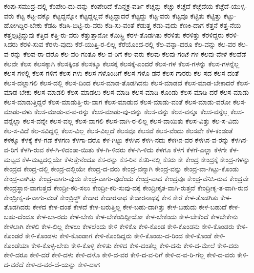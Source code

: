 {ಕೆಂಪು-ಸಮುದ್ರ-ದಲ್ಲಿ
ಕೆಂಪೇರಿ-ದು-ದನ್ನು
ಕೆಂಪೇರಿದೆ
ಕೆಎನ್ಚಕ್ರ-ವರ್ತಿ
ಕೆಚ್ಚನ್ನು
ಕೆಚ್ಚು
ಕೆಚ್ಚೆದೆ
ಕೆಚ್ಚೆದೆಯ
ಕೆಚ್ಚೆದೆ-ಯುಳ್ಳ-ವರು
ಕೆಟ್ಟ
ಕೆಟ್ಟ-ದಕ್ಕೊ
ಕೆಟ್ಟದ್ದನ್ನೋ
ಕೆಟ್ಟದ್ದಲ್ಲವೆ
ಕೆಟ್ಟದ್ದಾದರೆ
ಕೆಟ್ಟದ್ದು
ಕೆಟ್ಟ-ವರು
ಕೆಟ್ಟವೂ
ಕೆಟ್ಟಿತು
ಕೆಟ್ಟಿತ್ತು
ಕೆಟ್ಟು-ಹೋಗಿದ್ದಿರ-ಬೇಕು
ಕೆಡಹಿ
ಕೆಡಿಸಿ-ಬಿಟ್ಟಿ-ರು-ವರು
ಕೆಡಿ-ಸು-ವಂತೆ
ಕೆಡುತ್ತ
ಕೆಡು-ವುದು
ಕೆಣಕಿ-ದಾಗ
ಕೆತ್ತನೆ
ಕೆತ್ತ-ನೆಯ
ಕೆತ್ತಲ್ಪಟ್ಟಿದ್ದುವು
ಕೆತ್ತಿದ
ಕೆತ್ತಿ-ರು-ವರು
ಕೆತ್ತುತ್ತಾನೋ
ಕೆಮಿಸ್ಟ್ರಿ
ಕೆರಳ-ತೊಡಗಿತು
ಕೆರಳಿತು
ಕೆರಳಿತ್ತು
ಕೆರಳಿದ್ದರು
ಕೆರಳಿ-ಸಿದರು
ಕೆರಳಿ-ಸುವ
ಕೆರಳು-ವುದು
ಕೆರೆ-ಯುತ್ತಿ-ರ-ಲಿಲ್ಲ
ಕೆರೆಯೊಂದ-ರಲ್ಲಿ
ಕೆಲ-ವನ್ನಾ-ದರೂ
ಕೆಲ-ವನ್ನು
ಕೆಲ-ವರ
ಕೆಲ-ವ-ರನ್ನು
ಕೆಲವ-ರಾ-ದರೊ
ಕೆಲ-ವರಿ-ಗಂತೂ
ಕೆಲ-ವ-ರಿಗೆ
ಕೆಲ-ವರು
ಕೆಲವು
ಕೆಲವು-ಗಂಟೆ-ಗಳ
ಕೆಲವು-ವೇಳೆ
ಕೆಲವೆಡೆ
ಕೆಲವೇ
ಕೆಲಸ
ಕೆಲಸಕ್ಕಾಗಿ
ಕೆಲಸಕ್ಕಿಂತ
ಕೆಲಸಕ್ಕೂ
ಕೆಲಸಕ್ಕೆ
ಕೆಲಸಕ್ಕೆ-ಎಂದರೆ
ಕೆಲಸ-ಗಳ
ಕೆಲಸ-ಗಳನ್ನು
ಕೆಲಸ-ಗಳನ್ನೆಲ್ಲ
ಕೆಲಸ-ಗಳಲ್ಲಿ
ಕೆಲಸ-ಗಳಿಗೆ
ಕೆಲಸ-ಗಳು
ಕೆಲಸ-ಗಳೊಂದಿಗೆ
ಕೆಲಸ-ಗಳೊ-ಡನೆ
ಕೆಲಸ-ಗಾರರು
ಕೆಲ-ಸದ
ಕೆಲಸ-ದಂತೆ
ಕೆಲಸ-ದಲ್ಲಾಗಲಿ
ಕೆಲಸ-ದಲ್ಲಿ
ಕೆಲಸ-ದಿಂದ
ಕೆಲಸ-ಮಾಡ-ತೊಡಗಿದನು
ಕೆಲಸ-ಮಾಡದೆ
ಕೆಲಸ-ಮಾಡ-ಬೇಕಾದರೆ
ಕೆಲಸ-ಮಾಡ-ಬೇಕು
ಕೆಲಸ-ಮಾಡಲಿ
ಕೆಲಸ-ಮಾಡಲು
ಕೆಲಸ-ಮಾಡಿ
ಕೆಲಸ-ಮಾಡಿ-ಕೊಂಡು
ಕೆಲಸ-ಮಾಡಿ-ದರೆ
ಕೆಲಸ-ಮಾಡು
ಕೆಲಸ-ಮಾಡುತ್ತಿದ್ದರೆ
ಕೆಲಸ-ಮಾಡುತ್ತಿ-ರು-ವಾಗ
ಕೆಲಸ-ಮಾಡುವ
ಕೆಲಸ-ಮಾಡು-ವಂತೆ
ಕೆಲಸ-ಮಾಡು-ವರೋ
ಕೆಲಸ-ಮಾಡು-ವಳು
ಕೆಲಸ-ಮಾಡು-ವ-ವ-ರನ್ನು
ಕೆಲಸ-ಮಾಡು-ವು-ದನ್ನು
ಕೆಲಸ-ವನ್ನು
ಕೆಲಸ-ವನ್ನೂ
ಕೆಲಸ-ವನ್ನೆಲ್ಲ
ಕೆಲಸ-ವನ್ನೆಲ್ಲಾ
ಕೆಲಸ-ವನ್ನೇ
ಕೆಲಸ-ವಲ್ಲ
ಕೆಲಸ-ವಾಗಲಿ
ಕೆಲಸ-ವಾಗಿ-ರ-ಲಿಲ್ಲ
ಕೆಲಸ-ವಾಯಿತು
ಕೆಲಸ-ವಿತ್ತು
ಕೆಲ-ಸ-ವಿದು
ಕೆಲ-ಸ-ವಿದೆ
ಕೆಲ-ಸವಿದ್ದಲ್ಲಿ
ಕೆಲಸ-ವಿಲ್ಲ
ಕೆಲಸ-ವಿಲ್ಲದೆ
ಕೆಲಸವೂ
ಕೆಲಸವೆ
ಕೆಲಸ-ವೆಂದು
ಕೆಲಸವೇ
ಕೆಳ-ಕಂಡಂತೆ
ಕೆಳಕ್ಕೂ
ಕೆಳಕ್ಕೆ
ಕೆಳ-ಗಡೆ
ಕೆಳಗಣ
ಕೆಳಗಾ-ದರೊ
ಕೆಳ-ಗಿಟ್ಟು
ಕೆಳಗಿನ
ಕೆಳಗಿ-ನದು
ಕೆಳಗಿನ-ವರ
ಕೆಳಗಿನ-ವ-ರನ್ನು
ಕೆಳಗಿನ-ವ-ರಿಗೆ
ಕೆಳಗಿ-ರುವ
ಕೆಳ-ಗಿ-ಳಿದಂತಾ-ಯಿತು
ಕೆಳ-ಗಿ-ಳಿದರು
ಕೆಳ-ಗಿ-ಳಿದು
ಕೆಳಗೂ
ಕೆಳಗೆ
ಕೆಳಗೆ-ಎಲ್ಲಾ
ಕೆಳಗೇ
ಕೆಳ-ಮಟ್ಟದ
ಕೆಳ-ಮಟ್ಟದಲ್ಲಿಯೇ
ಕೆಳುತ್ತೇನೆಂದೂ
ಕೆಸ-ರನ್ನು
ಕೆಸ-ರಿನ
ಕೆಸರಿ-ನಲ್ಲಿ
ಕೆಸರು
ಕೇ
ಕೇಂದ್ರ
ಕೇಂದ್ರಕ್ಕೆ
ಕೇಂದ್ರ-ಗಳನ್ನು
ಕೇಂದ್ರದ
ಕೇಂದ್ರ-ದಲ್ಲಿ
ಕೇಂದ್ರ-ದಲ್ಲಿಯೇ
ಕೇಂದ್ರ-ದ-ವರು
ಕೇಂದ್ರ-ವನ್ನಾಗಿ
ಕೇಂದ್ರ-ವನ್ನು
ಕೇಂದ್ರ-ವಾ-ಗಿಟ್ಟು-ಕೊಂಡು
ಕೇಂದ್ರ-ವಾಗಿತ್ತು
ಕೇಂದ್ರ-ವಾಗು-ವುದು
ಕೇಂದ್ರ-ವಾಗು-ವುದೆಂದು
ಕೇಂದ್ರ-ವಾದ
ಕೇಂದ್ರವೂ
ಕೇಂದ್ರ-ವೆನಿಸಿ-ರುವ
ಕೇಂದ್ರವೇ
ಕೇಂದ್ರಸ್ಥಾನ-ವಾಗುತ್ತದೆ
ಕೇಂದ್ರೀ-ಕರಿ-ಸಲು
ಕೇಂದ್ರೀ-ಕರಿ-ಸುವು-ದಕ್ಕೆ
ಕೇಂದ್ರೀಕೃತ-ವಾಗಿ-ರುತ್ತದೆ
ಕೇಂದ್ರೀಕೃ-ತ-ವಾಗಿ-ರುವ
ಕೇಂದ್ರೀಕೃ-ತ-ವಾಗು-ವಂತೆ
ಕೇಂಬ್ರಿಡ್ಜ್
ಕೇದಾರ
ಕೇದಾರನಾಥ
ಕೇದಾರನಾಥಕ್ಕೆ
ಕೇನ
ಕೇರೆ
ಕೇಳ-ತೊಡಗಿತು
ಕೇಳ-ತೊಡಗಿದರು
ಕೇಳದ
ಕೇಳ-ದಂತೆ
ಕೇಳದೆ
ಕೇಳ-ಬರುತ್ತಿಲ್ಲ
ಕೇಳ-ಬಹು-ದಾಗಿತ್ತು
ಕೇಳ-ಬಹುದು
ಕೇಳ-ಬಹುದೆ
ಕೇಳ-ಬಹು-ದೆಂದೂ
ಕೇಳ-ಬಾ-ರದು
ಕೇಳ-ಬೇಕು
ಕೇಳ-ಬೇಕೆಂದಿದ್ದೀಯೋ
ಕೇಳ-ಬೇಕೆಂದು
ಕೇಳ-ಬೇಕೆಂದೆ
ಕೇಳಬೇಕೇನು
ಕೇಳಲಾಗಿ
ಕೇಳಲಿ
ಕೇಳ-ಲಿಲ್ಲ
ಕೇಳಲು
ಕೇಳಲೆಂದು
ಕೇಳಿ
ಕೇಳಿಕೊ
ಕೇಳಿ-ಕೊಂಡ
ಕೇಳಿ-ಕೊಂಡನು
ಕೇಳಿ-ಕೊಂಡರು
ಕೇಳಿ-ಕೊಂಡರೆ
ಕೇಳಿ-ಕೊಂಡಳು
ಕೇಳಿ-ಕೊಂಡಾಗ
ಕೇಳಿ-ಕೊಂಡಿದ್ದರು
ಕೇಳಿ-ಕೊಂಡು-ದ-ರಿಂದ
ಕೇಳಿ-ಕೊಂಡೆ
ಕೇಳಿ-ಕೊಂಡೆಯಾ
ಕೇಳಿ-ಕೊಳ್ಳ-ಬೇಕು
ಕೇಳಿ-ಕೊಳ್ಳಿ
ಕೇಳಿತು
ಕೇಳಿದ
ಕೇಳಿ-ದಂತೆಲ್ಲ
ಕೇಳಿ-ದನು
ಕೇಳಿ-ದ-ಮೇಲೆ
ಕೇಳಿ-ದರು
ಕೇಳಿ-ದರೂ
ಕೇಳಿ-ದರೆ
ಕೇಳಿ-ದಳು
ಕೇಳಿ-ದಳೊ
ಕೇಳಿ-ದ-ವರ
ಕೇಳಿ-ದ-ವ-ರಿಗೆ
ಕೇಳಿ-ದ-ವ-ರಿ-ಗೆಲ್ಲ
ಕೇಳಿ-ದ-ವರು
ಕೇಳಿ-ದ-ವರೆದೆ
ಕೇಳಿ-ದ-ವರೆ-ದೆ-ಯನ್ನು
ಕೇಳಿ-ದಾಗ
}
